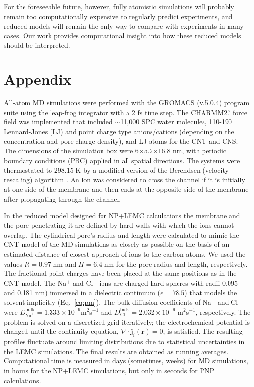 \documentclass[fleqn,10pt]{SelfArx} %
\begin{document}
For the foreseeable future, however, fully atomistic simulations will probably remain too computationally expensive to regularly predict experiments, and reduced models will remain the only way to compare with experiments in many cases.
Our work provides computational insight into how these reduced models should be interpreted.


 \section*{Appendix}
 \label{sec:modelsandmethods}

All-atom MD simulations were performed with the GROMACS (v.5.0.4) program suite \cite{Berendsen199543,Pronk01042013} using the leap-frog integrator with a 2 fs time step. 
The CHARMM27 force field \cite{charmm} was implemented that included $\sim$11,000 SPC water molecules, 110-190 Lennard-Jones (LJ) and point charge type anions/cations (depending on the concentration and pore charge density), and LJ atoms for the CNT and CNS. 
The dimensions of the simulation box were 6$\times$5.2$\times$16.8 nm, with periodic boundary conditions (PBC) applied in all spatial directions. 
The systems were thermostated to 298.15 K by a modified version of the Berendsen (velocity rescaling) algorithm \cite{bussi_jcp_2007}.
An ion was considered to cross the channel if it is initially at one side of the membrane and then ends at the opposite side of the membrane after propagating through the channel.

In the reduced model designed for NP+LEMC calculations the membrane and the pore penetrating it are defined by hard walls with which the ions cannot overlap.
The cylindrical pore's radius and length were calculated to mimic the CNT model of the MD simulations as closely as possible on the basis of an estimated distance of closest approach of ions to the carbon atoms.
We used the values $R=0.97$ nm and $H=6.4$ nm for the pore radius and length, respectively.
The fractional point charges have been placed at the same positions as in the CNT model. 
The Na$^{+}$ and Cl$^{-}$ ions are charged hard spheres with radii 0.095 and 0.181 nm) immersed in a dielectric continuum ($\epsilon =78.5$) that models the solvent implicitly (Eq.\ \ref{eq:pm}).
The bulk diffusion coefficients of Na$^{+}$ and Cl$^{-}$ were $D_{\mathrm{Na}^{+}}^{\mathrm{bulk}}=1.333\times 10^{-9}$m$^{2}$s$^{-1}$ and $D_{\mathrm{Cl}^{-}}^{\mathrm{bulk}}=2.032\times 10^{-9}$ m$^{2}$s$^{-1}$, respectively.
The problem is solved on a discretized grid iteratively; the electrochemical potential is changed until the continuity equation, $\nabla \cdot \mathbf{j}_{i}(\mathbf{r})=0$, is satisfied.
The resulting profiles fluctuate around limiting distributions due to statistical uncertainties in the LEMC simulations.
The final results are obtained as running averages.
Computational time is measured in days (sometimes, weeks) for MD simulations, in hours for the NP+LEMC simulations, but only in seconds for PNP calculations.
\end{document}
